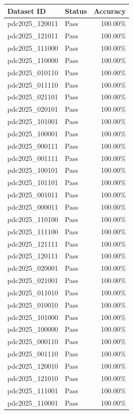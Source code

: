 \begin{table}[ht]
\centering
\begin{tabular}{llr}
\toprule
Dataset ID & Status & Accuracy \\
\midrule
pdc2025_120011 & Pass & 100.00\% \\
pdc2025_121011 & Pass & 100.00\% \\
pdc2025_111000 & Pass & 100.00\% \\
pdc2025_110000 & Pass & 100.00\% \\
pdc2025_010110 & Pass & 100.00\% \\
pdc2025_011110 & Pass & 100.00\% \\
pdc2025_021101 & Pass & 100.00\% \\
pdc2025_020101 & Pass & 100.00\% \\
pdc2025_101001 & Pass & 100.00\% \\
pdc2025_100001 & Pass & 100.00\% \\
pdc2025_000111 & Pass & 100.00\% \\
pdc2025_001111 & Pass & 100.00\% \\
pdc2025_100101 & Pass & 100.00\% \\
pdc2025_101101 & Pass & 100.00\% \\
pdc2025_001011 & Pass & 100.00\% \\
pdc2025_000011 & Pass & 100.00\% \\
pdc2025_110100 & Pass & 100.00\% \\
pdc2025_111100 & Pass & 100.00\% \\
pdc2025_121111 & Pass & 100.00\% \\
pdc2025_120111 & Pass & 100.00\% \\
pdc2025_020001 & Pass & 100.00\% \\
pdc2025_021001 & Pass & 100.00\% \\
pdc2025_011010 & Pass & 100.00\% \\
pdc2025_010010 & Pass & 100.00\% \\
pdc2025_101000 & Pass & 100.00\% \\
pdc2025_100000 & Pass & 100.00\% \\
pdc2025_000110 & Pass & 100.00\% \\
pdc2025_001110 & Pass & 100.00\% \\
pdc2025_120010 & Pass & 100.00\% \\
pdc2025_121010 & Pass & 100.00\% \\
pdc2025_111001 & Pass & 100.00\% \\
pdc2025_110001 & Pass & 100.00\% \\

\end{tabular}
\end{table}
